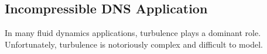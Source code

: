 \subsection{Incompressible DNS Application}
\label{sec:dns_full}

In many fluid dynamics applications, turbulence plays a
dominant role. Unfortunately, turbulence is 
notoriously complex and difficult to model. 